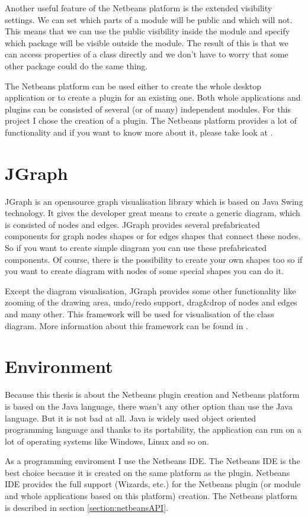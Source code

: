 Another useful feature of the Netbeans platform is the extended visibility settings. We can set which parts of a module will be public and which will not. This means that we can use the public visibility inside the module and specify which package will be visible outside the module. The result of this is that we can access properties of a class directly and we don't have to worry that some other package could do the same thing.

The Netbeans platform can be used either to create the whole desktop application or to create a plugin for an existing one. Both whole applications and plugins can be consisted of several (or of many) independent modules. For this project I chose the creation of a plugin. The Netbeans platform provides a lot of functionality and if you want to know more about it, please take look at \cite{netbeans6.9DevGuide}.

\section{JGraph}
\label{section:JGraph}

JGraph is an opensource graph visualisation library which is based on Java Swing technology. It gives the developer great means to create a generic diagram, which is consisted of nodes and edges. JGraph provides several prefabricated components for graph nodes shapes or for edges shapes that connect these nodes. So if you want to create simple diagram you can use these prefabricated components. Of course, there is the possibility to create your own shapes too so if you want to create diagram with nodes of some special shapes you can do it.

Except the diagram visualisation, JGraph provides some other functionality like zooming of the drawing area, undo/redo support, drag\&drop of nodes and edges and many other. This framework will be used for visualisation of the class diagram. More information about this framework can be found in \cite{jgraphmanual}.

\section{Environment}

Because this thesis is about the Netbeans plugin creation and Netbeans platform is based on the Java language, there wasn't any other option than use the Java language. But it is not bad at all. Java is widely used object oriented programming language and thanks to its portability, the application can run on a lot of operating systems like Windows, Linux and so on.

As a programming enviroment I use the Netbeans IDE. The Netbeans IDE is the best choice because it is created on the same platform as the plugin. Netbeans IDE provides the full support (Wizards, etc.) for the Netbeans plugin (or module and whole applications based on this platform) creation. The Netbeans platform is described in section \ref{section:netbeansAPI}.
